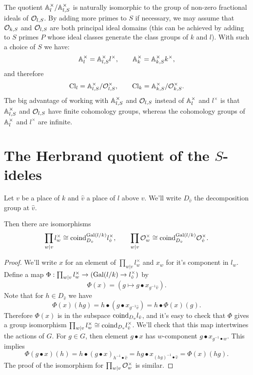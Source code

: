The quotient ${\mathbb A}_l^\times / {\mathbb A}_{l,S}^\times$ is naturally isomorphic to the
group of non-zero fractional ideals of ${\mathcal O}_{l,S}$.
By adding more primes to $S$ if necessary, we may assume that ${\mathcal O}_{k,S}$ and ${\mathcal O}_{l,S}$ are both
principal ideal domains (this can be achieved by adding to $S$ primes $P$ whose ideal classes
generate the class groups of $k$ and $l$).
With such a choice of $S$ we have:
\[
	{\mathbb A}_{l}^\times = {\mathbb A}_{l,S}^\times l^\times,
	\qquad
	{\mathbb A}_k^\times = {\mathbb A}_{k,S}^\times k^\times,
\]
and therefore
\[
	\mathrm{Cl}_{l} = {\mathbb A}_{l,S}^\times / {\mathcal O}_{l,S}^\times, \qquad
	\mathrm{Cl}_{k} = {\mathbb A}_{k,S}^\times / {\mathcal O}_{k,S}^\times.
\]
The big advantage of working with ${\mathbb A}_{l,S}^\times$ and ${\mathcal O}_{l,S}$ instead of ${\mathbb A}_l^\times$ and
$l^\times$ is that ${\mathbb A}_{l,S}^\times$ and ${\mathcal O}_{l,S}$ have finite cohomology groups,
whereas the cohomology groups of ${\mathbb A}_l^\times$ and $l^\times$ are infinite.





\section{The Herbrand quotient of the $S$-ideles}

Let $v$ be a place of $k$ and $\hat v$ a place of $l$ above $v$.
We'll write $D_{\hat v}$ the decomposition group at $\hat v$.

\begin{lemma} \label{lem:semi-local iso coind}
	Then there are isomorphisms
	\[
		\prod_{w | v} l_w^\times
		\cong
		\mathrm{coind}_{D_{\hat v}}^{\mathrm{Gal}(l/k)} l_{\hat v}^\times,
		\qquad
		\prod_{w | v} {\mathcal O}_w^\times
		\cong
		\mathrm{coind}_{D_{\hat v}}^{\mathrm{Gal}(l/k)} {\mathcal O}_{\hat v}^\times.
	\]
\end{lemma}

\begin{proof}
	We'll write $x$ for an element of $\prod_{w | v} l_w^\times$ and $x_w$ for it's component in $l_w$.
	Define a map $\Phi : \prod_{w | v} l_w^\times \to (\mathrm{Gal}(l/k) \to l_{\hat v}^\times)$ by
	\[
		\Phi (x)
		=
		(g \mapsto g \bullet x_{g^{-1} \hat v}).
	\]
	Note that for $h \in D_{\hat v}$ we have
	\[
		\Phi (x) (hg) = h \bullet (g \bullet x_{g^{-1} \hat v}) = h \bullet \Phi(x) (g).
	\]
	Therefore $\Phi(x)$ is in the subspace $\mathrm{coind}_{D_v} l_{\hat v}$, and it's
	easy to check that $\Phi$ gives a group isomorphism
	$\prod_{w | v} l_w^\times \cong \mathrm{coind}_{D_v} l_{\hat v}^\times$.
	We'll check that this map intertwines the actions of $G$.
	For $g \in G$, then element $g \bullet x$ has $w$-component
	$g \bullet x_{g^{-1}\bullet w}$.
	This implies
	\[
		\Phi( g \bullet x)(h)
		=	h\bullet (g \bullet x)_{h^{-1} \bullet \hat v}
		=	h g \bullet x_{(hg)^{-1} \bullet \hat v}
		= \Phi (x) (hg).
	\]
	The proof of the isomorphism for $\prod_{w | v} {\mathcal O}_w^\times$ is similar.
\end{proof}

